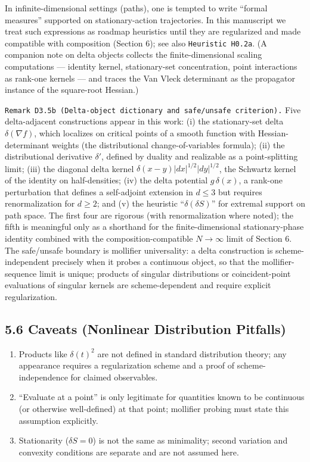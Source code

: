 \documentclass[
]{article}
\providecommand{\tightlist}{%
  \setlength{\itemsep}{0pt}\setlength{\parskip}{0pt}}
\begin{document}
In infinite-dimensional settings (paths), one is tempted to write
``formal measures'' supported on stationary-action trajectories. In this
manuscript we treat such expressions as roadmap heuristics until they
are regularized and made compatible with composition (Section 6); see
also \texttt{Heuristic\ H0.2a}. (A companion note on delta objects
collects the finite-dimensional scaling computations --- identity
kernel, stationary-set concentration, point interactions as rank-one
kernels --- and traces the Van Vleck determinant as the propagator
instance of the square-root Hessian.)

\texttt{Remark\ D3.5b\ (Delta-object\ dictionary\ and\ safe/unsafe\ criterion).}
Five delta-adjacent constructions appear in this work: (i) the
stationary-set delta \(\delta(\nabla f)\), which localizes on critical
points of a smooth function with Hessian-determinant weights (the
distributional change-of-variables formula); (ii) the distributional
derivative \(\delta'\), defined by duality and realizable as a
point-splitting limit; (iii) the diagonal delta kernel
\(\delta(x-y)|dx|^{1/2}|dy|^{1/2}\), the Schwartz kernel of the identity
on half-densities; (iv) the delta potential \(g\,\delta(x)\), a rank-one
perturbation that defines a self-adjoint extension in \(d\le3\) but
requires renormalization for \(d\ge2\); and (v) the heuristic
``\(\delta(\delta S)\)'' for extremal support on path space. The first
four are rigorous (with renormalization where noted); the fifth is
meaningful only as a shorthand for the finite-dimensional
stationary-phase identity combined with the composition-compatible
\(N\to\infty\) limit of Section 6. The safe/unsafe boundary is mollifier
universality: a delta construction is scheme-independent precisely when
it probes a continuous object, so that the mollifier-sequence limit is
unique; products of singular distributions or coincident-point
evaluations of singular kernels are scheme-dependent and require
explicit regularization.

\subsection{5.6 Caveats (Nonlinear Distribution
Pitfalls)}\label{caveats-nonlinear-distribution-pitfalls}

\begin{enumerate}
\def\labelenumi{\arabic{enumi}.}
\tightlist
\item
  Products like \(\delta(t)^2\) are not defined in standard distribution
  theory; any appearance requires a regularization scheme and a proof of
  scheme-independence for claimed observables.
\item
  ``Evaluate at a point'' is only legitimate for quantities known to be
  continuous (or otherwise well-defined) at that point; mollifier
  probing must state this assumption explicitly.
\item
  Stationarity (\(\delta S=0\)) is not the same as minimality; second
  variation and convexity conditions are separate and are not assumed
  here.
\end{enumerate}
\end{document}
